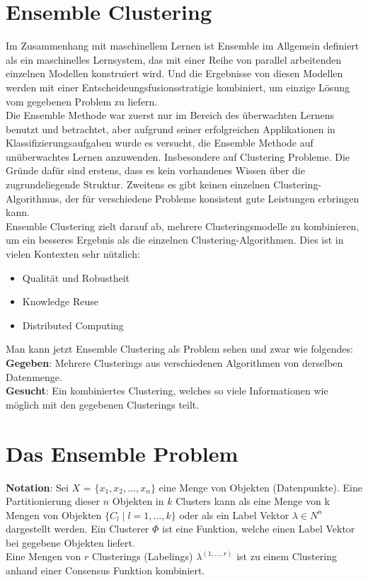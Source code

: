 \documentclass[runningheads]{llncs}
\begin{document}
\section{Ensemble Clustering}
Im Zusammenhang mit maschinellem Lernen ist Ensemble im Allgemein definiert als ein maschinelles Lernsystem, das mit einer Reihe von parallel arbeitenden einzelnen Modellen konstruiert wird. Und die Ergebnisse von diesen Modellen werden mit einer Entscheideungsfusionsstratigie kombiniert, um einzige Lösung vom gegebenen Problem zu liefern.\\[4pt]
 Die Ensemble Methode war zuerst nur im Bereich des überwachten Lernens benutzt und betrachtet, aber aufgrund seiner erfolgreichen Applikationen in Klassifizierungsaufgaben wurde es versucht, die Ensemble Methode auf unüberwachtes Lernen anzuwenden. Insbesondere auf Clustering Probleme. Die Gründe dafür sind erstens, dass es kein vorhandenes Wissen über die zugrundeliegende Struktur. Zweitens es gibt keinen einzelnen Clustering-Algorithmus, der für verschiedene Probleme konsistent gute Leistungen erbringen kann.\\[4pt]
 Ensemble Clustering zielt darauf ab, mehrere Clusteringsmodelle zu kombinieren, um ein besseres Ergebnis als die einzelnen Clustering-Algorithmen. Dies ist in vielen Kontexten sehr nützlich: 
\begin{itemize}
	\item Qualität und Robustheit  
	\item Knowledge Reuse 
	\item Distributed Computing     
\end{itemize}
Man kann jetzt Ensemble Clustering als Problem sehen und zwar wie folgendes:\\[4pt]
\textbf{Gegeben}: Mehrere Clusterings aus verschiedenen Algorithmen von derselben Datenmenge.\\[4pt]
\textbf{Gesucht}: Ein kombiniertes Clustering, welches so viele Informationen wie möglich mit den gegebenen Clusterings teilt. 


\section{Das Ensemble Problem}
\textbf{Notation}: Sei $X$ = $\{x_1, x_2, \ldots, x_n\}$ eine Menge von Objekten (Datenpunkte). Eine Partitionierung dieser $n$ Objekten in $k$ Clusters kann als eine Menge von k Mengen von Objekten $\{C_{l} \mid l = 1, \ldots, k\}$ oder als ein Label Vektor $\lambda \in {N}^{n}$ dargestellt werden. Ein Clusterer $\Phi$ ist eine Funktion, welche einen Label Vektor bei gegebene Objekten liefert.\\[4pt] 
Eine Mengen von $r$ Clusterings (Labelings) $\lambda^{(1, \dots, r)}$ ist zu einem Clustering anhand einer Consensus Funktion kombiniert. 
\end{document}
